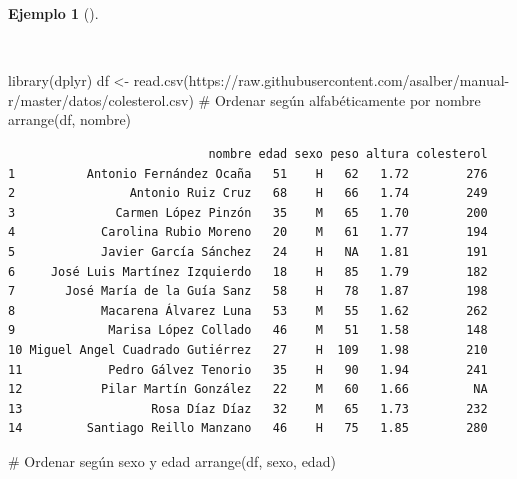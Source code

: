 \documentclass[
  a4paper,
]{scrreport}
\newenvironment{Shaded}{\begin{snugshade}}{\end{snugshade}}
\newcommand{\CommentTok}[1]{\textcolor[rgb]{0.37,0.37,0.37}{#1}}
\newcommand{\FunctionTok}[1]{\textcolor[rgb]{0.28,0.35,0.67}{#1}}
\newcommand{\NormalTok}[1]{\textcolor[rgb]{0.00,0.23,0.31}{#1}}
\newcommand{\OtherTok}[1]{\textcolor[rgb]{0.00,0.23,0.31}{#1}}
\newcommand{\StringTok}[1]{\textcolor[rgb]{0.13,0.47,0.30}{#1}}
\theoremstyle{definition}
\theoremstyle{definition}
\newtheorem{example}{Ejemplo}[chapter]
\theoremstyle{remark}
\begin{document}
\begin{example}[]\protect\hypertarget{exm-arrange}{}\label{exm-arrange}

~

\begin{Shaded}
\begin{Highlighting}[]
\FunctionTok{library}\NormalTok{(dplyr)}
\NormalTok{df }\OtherTok{\textless{}{-}} \FunctionTok{read.csv}\NormalTok{(}\StringTok{\textquotesingle{}https://raw.githubusercontent.com/asalber/manual{-}r/master/datos/colesterol.csv\textquotesingle{}}\NormalTok{)}
\CommentTok{\# Ordenar según alfabéticamente por nombre}
\FunctionTok{arrange}\NormalTok{(df, nombre)}
\end{Highlighting}
\end{Shaded}

\begin{verbatim}
                            nombre edad sexo peso altura colesterol
1          Antonio Fernández Ocaña   51    H   62   1.72        276
2                Antonio Ruiz Cruz   68    H   66   1.74        249
3              Carmen López Pinzón   35    M   65   1.70        200
4            Carolina Rubio Moreno   20    M   61   1.77        194
5            Javier García Sánchez   24    H   NA   1.81        191
6     José Luis Martínez Izquierdo   18    H   85   1.79        182
7       José María de la Guía Sanz   58    H   78   1.87        198
8            Macarena Álvarez Luna   53    M   55   1.62        262
9             Marisa López Collado   46    M   51   1.58        148
10 Miguel Angel Cuadrado Gutiérrez   27    H  109   1.98        210
11            Pedro Gálvez Tenorio   35    H   90   1.94        241
12           Pilar Martín González   22    M   60   1.66         NA
13                  Rosa Díaz Díaz   32    M   65   1.73        232
14         Santiago Reillo Manzano   46    H   75   1.85        280
\end{verbatim}

\begin{Shaded}
\begin{Highlighting}[]
\CommentTok{\# Ordenar según sexo y edad}
\FunctionTok{arrange}\NormalTok{(df, sexo, edad)}
\end{Highlighting}
\end{Shaded}


\end{example}
\end{document}
